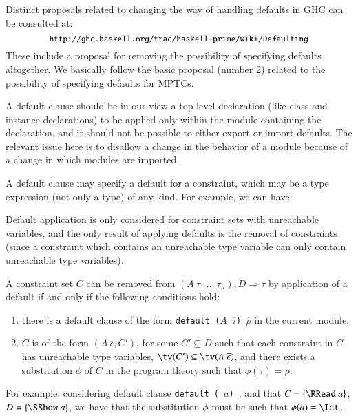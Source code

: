 \documentclass[review]{elsarticle}
\begin{document}
Distinct proposals related to changing the way of handling defaults in
GHC can be consulted at:
  \[ {\small\texttt{http://ghc.haskell.org/trac/haskell-prime/wiki/Defaulting}} \]
These include a proposal for removing the possibility of specifying
defaults altogether. We basically follow the basic proposal (number 2)
related to the possibility of specifying defaults for MPTCs.

A default clause should be in our view a top level declaration (like
class and instance declarations) to be applied only within the module
containing the declaration, and it should not be possible to either
export or import defaults. The relevant issue here is to disallow a
change in the behavior of a module because of a change in which
modules are imported.

A default clause may specify a default for a constraint, which may be
a type expression (not only a type) of any kind. For example, we can
have:

Default application is only considered for constraint sets with
unreachable variables, and the only result of applying defaults is the
removal of constraints (since a constraint which contains an
unreachable type variable can only contain unreachable type
variables).

A constraint set $C$ can be removed from $(A\:\tau_1\:\ldots\ \tau_n),
D \Rightarrow \tau$ by application of a default if and only if the
following conditions hold:
  \begin{enumerate}

   \item there is a default clause of the form {\tt default ($A$
     $\overline{\tau}$) $\overline{\rho}$} in the current module,

   \item $C$ is of the form $(A\:\overline{\epsilon}, C')$, for some
     $C' \subseteq D$ such that each constraint in $C$ has unreachable
     type variables, $\tv(C') \subseteq \tv(A\:\overline{\epsilon})$,
     and there exists a substitution $\phi$ of $C$ in the program
     theory such that $\phi(\overline{\tau}) = \overline{\rho}$.

  \end{enumerate}

For example, considering default clause {\tt default (\RRead\ $a$)
  \Int}, and that $C = \{\RRead\ a\}$, $D = \{ \SShow\ a\}$, we have
that the substitution $\phi$ must be such that $\phi(a) = \Int$.
\end{document}
